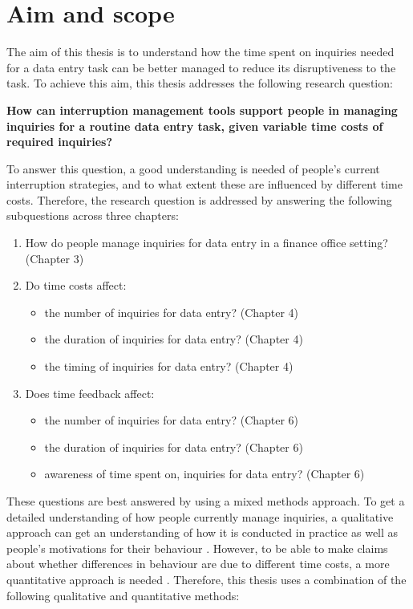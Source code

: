 \section{Aim and scope}
The aim of this thesis is to understand how the time spent on inquiries needed for a data entry task can be better managed to reduce its disruptiveness to the task. To achieve this aim, this thesis addresses the following research question:

\textbf{How can interruption management tools support people in managing inquiries for a routine data entry task, given variable time costs of required inquiries?}

To answer this question, a good understanding is needed of people's current interruption strategies, and to what extent these are influenced by different time costs. Therefore, the research question is addressed by answering the following subquestions across three chapters:

\begin{enumerate}
\item How do people manage inquiries for data entry in a finance office setting? (Chapter 3)
\item Do time costs affect:
\begin{itemize}
\item the number of inquiries for data entry? (Chapter 4)
\item the duration of inquiries for data entry? (Chapter 4)
\item the timing of inquiries for data entry?  (Chapter 4)
\end{itemize}
\item Does time feedback affect:
\begin{itemize}
\item the number of inquiries for data entry? (Chapter 6)
\item the duration of inquiries for data entry? (Chapter 6)
\item awareness of time spent on, inquiries for data entry? (Chapter 6)
\end{itemize}
\end{enumerate}

These questions are best answered by using a mixed methods approach. To get a detailed understanding of how people currently manage inquiries, a qualitative approach can get an understanding of how it is conducted in practice as well as people's motivations for their behaviour \citep{Blandford2016}. However, to be able to make claims about whether differences in behaviour are due to different time costs, a more quantitative approach is needed \citep{Cairns2008}.  
Therefore, this thesis uses a combination of the following qualitative and quantitative methods:

